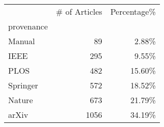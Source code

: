 \begin{tabular}{lrr}
\toprule
{} &  \# of Articles &  Percentage\%\\
provenance &                &            \\
\midrule
Manual     &             89 &        2.88\%\\
IEEE       &            295 &        9.55\%\\
PLOS       &            482 &       15.60\%\\
Springer   &            572 &       18.52\%\\
Nature     &            673 &       21.79\%\\
arXiv      &           1056 &       34.19\%\\
\bottomrule
\end{tabular}
